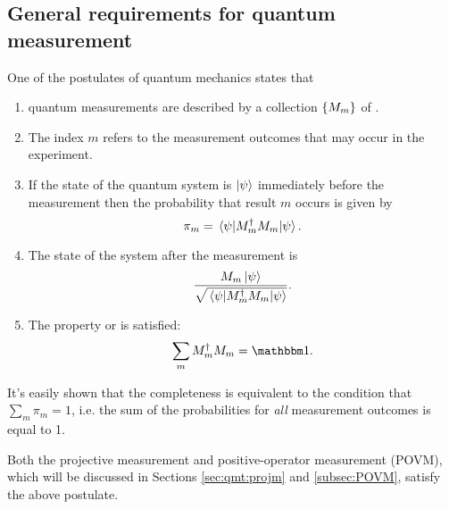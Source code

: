 \subsection{General requirements for quantum measurement}\label{sec:qmt:postulate}

One of the postulates of quantum mechanics \parencite[Sec. 2.2.3]{NielsenChuang}
states that
\begin{enumerate}
  \item
    quantum measurements are described by a collection
    $\left\{M_m\right\}$ of .
  \item
    The index $m$ refers to the measurement outcomes that
    may occur in the experiment.
  \item
    If the state of the quantum system is $\ket{\psi}$
    immediately before the measurement then the probability that result $m$ occurs is
    given by
    \begin{equation}\label{eq:qmt:postulate:prob}
      \pi_{m} = \ev{M^{\dagger}_{m} M_{m}}{\psi} \text{.}
    \end{equation}
  \item
    The state of the system after the measurement is
    \begin{equation}\label{eq:qmt:postulate:after}
      \frac{ M_m \ket{\psi} }{ \sqrt{\ev{M^{\dagger}_{m} M_{m}}{\psi}} } \text{.}
    \end{equation}
  \item
    The  property or  is satisfied:
    \begin{equation}\label{eq:qmt:postulate:completeness}
      \sum_m M_m^{\dagger} M_m = \idop \text{.}
    \end{equation}
\end{enumerate}

It's easily shown that the completeness is equivalent to the condition that
$\sum_m \pi_m = 1$, i.e. the sum of the probabilities for \emph{all} measurement outcomes is equal to 1.

Both the projective measurement and positive-operator measurement (POVM),
which will be discussed in Sections \ref{sec:qmt:projm} and \ref{subsec:POVM},
satisfy the above postulate.